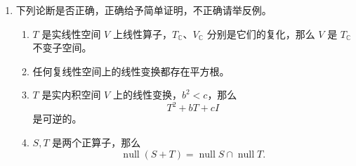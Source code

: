 \documentclass[UTF8]{ctexart}
\begin{document}
\begin{enumerate}
\item 下列论断是否正确，正确给予简单证明，不正确请举反例。

\begin{enumerate}
\item $T$ 是实线性空间 $V$ 上线性算子，$T_{\mathbb C}$、$V_{\mathbb C}$ 分别是它们的复化，那么 $V$ 是 $T_{\mathbb C}$ 不变子空间。
\item 任何复线性空间上的线性变换都存在平方根。
\item $T$ 是实内积空间 $V$ 上的线性变换，$b^2<c$，那么
\[
T^2+bT+cI
\]
是可逆的。
\item $S,T$ 是两个正算子，那么
\[
\operatorname{null}(S+T)
=
\operatorname{null}S\cap\operatorname{null}T.
\]
\end{enumerate}

\end{enumerate}
\end{document}
